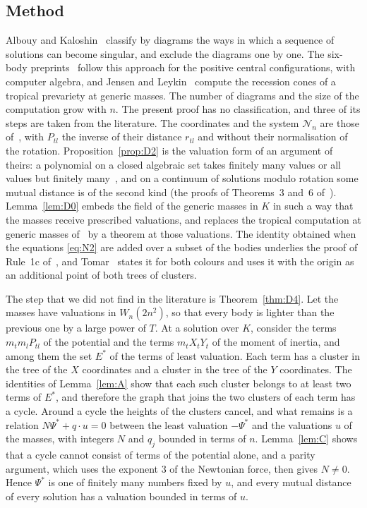 \documentclass[11pt]{amsart}
\theoremstyle{definition}
\theoremstyle{remark}
\numberwithin{equation}{section}
\newcommand{\cN}{\mathcal{N}}
\newcommand{\Ps}{\Psi^{*}}
\newcommand{\Es}{E^{*}}
\begin{document}
\subsection*{Method} Albouy and Kaloshin~\cite{albouykaloshin2012} classify by diagrams the ways in which
a sequence of solutions can become singular, and exclude the diagrams one by one. The six-body
preprints~\cite{tomar6,chentong6} follow this approach for the positive central configurations, with
computer algebra, and Jensen and Leykin~\cite{jensenleykin2025} compute the recession cones of a tropical
prevariety at generic masses. The number of diagrams and the size of the computation grow with $n$. The
present proof has no classification, and three of its steps are taken from the literature. The
coordinates and the system $\cN_n$ are those of~\cite[\S 2, system~(4)]{albouykaloshin2012}, with
$P_{tl}$ the inverse of their distance $r_{tl}$ and without their normalisation of the rotation.
Proposition~\ref{prop:D2} is the valuation form of an argument of theirs: a polynomial on a closed
algebraic set takes finitely many values or all values but finitely
many~\cite[Lemma~1]{albouykaloshin2012}, and on a continuum of solutions modulo rotation some mutual
distance is of the second kind (the proofs of Theorems~3 and~6
of~\cite{albouykaloshin2012}). Lemma~\ref{lem:D0} embeds the field of the generic masses in $K$ in such
a way that the masses receive prescribed valuations, and replaces the tropical computation at generic
masses of~\cite{jensenleykin2025} by a theorem at those valuations. The identity obtained when the
equations \eqref{eq:N2} are added over a subset of the bodies underlies the proof of Rule~1c
of~\cite[p.~546]{albouykaloshin2012}, and Tomar~\cite[\S 2.3, \S 4.1 and \S 9.1]{tomar6} states it for
both colours and uses it with the origin as an additional point of both trees of clusters.

The step that we did not find in the literature is Theorem~\ref{thm:D4}. Let the masses have valuations
in $W_n(2n^2)$, so that every body is lighter than the previous one by a large power of $T$. At a solution
over $K$, consider the terms $m_t m_l P_{tl}$ of the potential and the terms $m_t X_t Y_t$ of the moment
of inertia, and among them the set $\Es$ of the terms of least valuation. Each term has a cluster in the
tree of the $X$ coordinates and a cluster in the tree of the $Y$ coordinates. The identities of
Lemma~\ref{lem:A} show that each such cluster belongs to at least two terms of $\Es$, and therefore the
graph that joins the two clusters of each term has a cycle. Around a cycle the heights of the clusters
cancel, and what remains is a relation $N \Ps + q \cdot u = 0$ between the least valuation $-\Ps$ and the
valuations $u$ of the masses, with integers $N$ and $q_j$ bounded in terms of $n$. Lemma~\ref{lem:C}
shows that a cycle cannot consist of terms of the potential alone, and a parity argument, which uses the
exponent $3$ of the Newtonian force, then gives $N \ne 0$. Hence $\Ps$ is one of finitely many numbers
fixed by $u$, and every mutual distance of every solution has a valuation bounded in terms of $u$.
\end{document}
